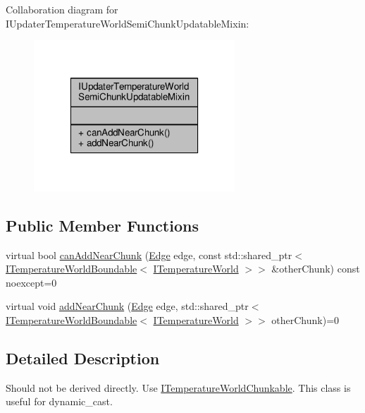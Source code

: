 Collaboration diagram for I\-Updater\-Temperature\-World\-Semi\-Chunk\-Updatable\-Mixin\-:
\nopagebreak
\begin{figure}[H]
\begin{center}
\leavevmode
\includegraphics[width=214pt]{class_i_updater_temperature_world_semi_chunk_updatable_mixin__coll__graph}
\end{center}
\end{figure}
\subsection*{Public Member Functions}
\begin{DoxyCompactItemize}
\item 
virtual bool \hyperlink{class_i_updater_temperature_world_semi_chunk_updatable_mixin_a35d2d34bcf2f9e857246bd8d92aec74f}{can\-Add\-Near\-Chunk} (\hyperlink{_edge_8hpp_a5be7c8fa582f7b873d1c6caacb633073}{Edge} edge, const std\-::shared\-\_\-ptr$<$ \hyperlink{class_i_temperature_world_boundable}{I\-Temperature\-World\-Boundable}$<$ \hyperlink{class_i_temperature_world}{I\-Temperature\-World} $>$$>$ \&other\-Chunk) const noexcept=0
\item 
virtual void \hyperlink{class_i_updater_temperature_world_semi_chunk_updatable_mixin_aa3139125095140f797df3cebb466c48a}{add\-Near\-Chunk} (\hyperlink{_edge_8hpp_a5be7c8fa582f7b873d1c6caacb633073}{Edge} edge, std\-::shared\-\_\-ptr$<$ \hyperlink{class_i_temperature_world_boundable}{I\-Temperature\-World\-Boundable}$<$ \hyperlink{class_i_temperature_world}{I\-Temperature\-World} $>$$>$ other\-Chunk)=0
\end{DoxyCompactItemize}


\subsection{Detailed Description}
Should not be derived directly. Use {\ttfamily \hyperlink{class_i_temperature_world_chunkable}{I\-Temperature\-World\-Chunkable}}. This class is useful for {\ttfamily dynamic\-\_\-cast}. 

